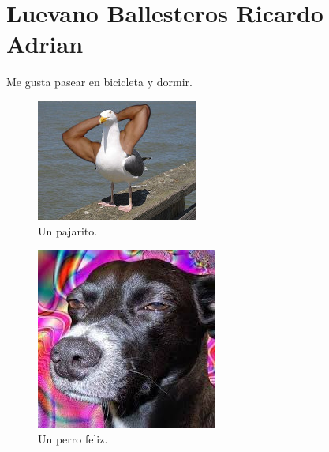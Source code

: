 \chapter{Luevano Ballesteros Ricardo Adrian}
Me gusta pasear en bicicleta y dormir.

\begin{figure}
  \begin{center}
    \includegraphics{410003725/pajarito.jpg}
    \caption{Un pajarito.}
  \end{center}
\end{figure}

\begin{figure}
  \includegraphics{410003725/perro.jpg}
  \caption{Un perro feliz.}
\end{figure}
